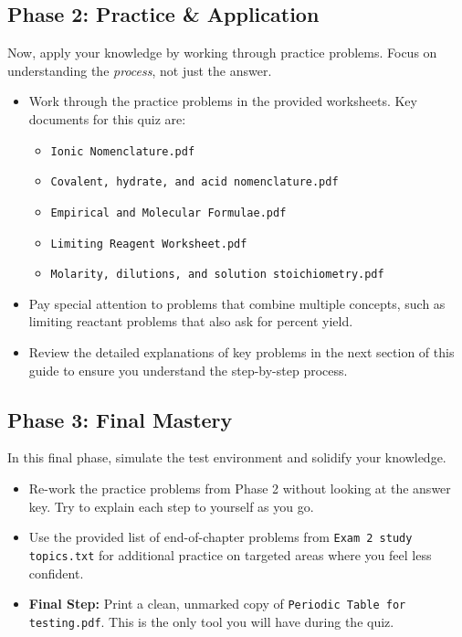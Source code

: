 \documentclass{article}
\begin{document}
\subsection*{Phase 2: Practice \& Application}
Now, apply your knowledge by working through practice problems. Focus on understanding the \textit{process}, not just the answer.
\begin{itemize}[itemsep=5pt]
    \item Work through the practice problems in the provided worksheets. Key documents for this quiz are:
    \begin{itemize}
        \item \texttt{Ionic Nomenclature.pdf}
        \item \texttt{Covalent, hydrate, and acid nomenclature.pdf}
        \item \texttt{Empirical and Molecular Formulae.pdf}
        \item \texttt{Limiting Reagent Worksheet.pdf}
        \item \texttt{Molarity, dilutions, and solution stoichiometry.pdf}
    \end{itemize}
    \item Pay special attention to problems that combine multiple concepts, such as limiting reactant problems that also ask for percent yield.
    \item Review the detailed explanations of key problems in the next section of this guide to ensure you understand the step-by-step process.
\end{itemize}

\bigskip
\subsection*{Phase 3: Final Mastery}
In this final phase, simulate the test environment and solidify your knowledge.
\begin{itemize}[itemsep=5pt]
    \item Re-work the practice problems from Phase 2 without looking at the answer key. Try to explain each step to yourself as you go.
    \item Use the provided list of end-of-chapter problems from \texttt{Exam 2 study topics.txt} for additional practice on targeted areas where you feel less confident.
    \item \textbf{Final Step:} Print a clean, unmarked copy of \texttt{Periodic Table for testing.pdf}. This is the only tool you will have during the quiz.
\end{itemize}
\end{document}
